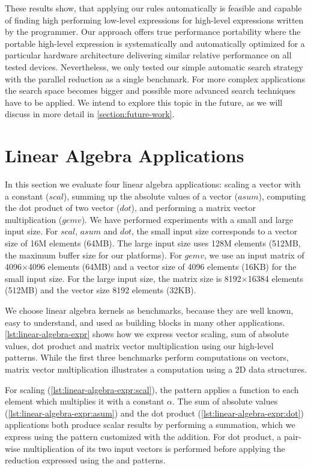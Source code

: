 \bigskip

\noindent
These results show, that applying our rules automatically is feasible and capable of finding high performing low-level expressions for high-level expressions written by the programmer.
Our approach offers true performance portability where the portable high-level expression is systematically and automatically optimized for a particular hardware architecture delivering similar relative performance on all tested devices.
Nevertheless, we only tested our simple automatic search strategy with the parallel reduction as a single benchmark.
For more complex applications the search space becomes bigger and possible more advanced search techniques have to be applied.
We intend to explore this topic in the future, as we will discuss in more detail in \autoref{section:future-work}.




\section{Linear Algebra Applications}

In this section we evaluate four linear algebra applications: scaling a vector with a constant ($scal$), summing up the absolute values of a vector ($asum$), computing the dot product of two vector ($dot$), and performing a matrix vector multiplication ($gemv$).
We have performed experiments with a small and large input size.
For $scal$, $asum$ and $dot$, the small input size corresponds to a vector size of 16M elements (64MB).
The large input size uses 128M elements (512MB, the maximum \OpenCL buffer size for our platforms).
For $gemv$, we use an input matrix of 4096$\times$4096 elements (64MB) and a vector size of 4096 elements (16KB) for the small input size.
For the large input size, the matrix size is 8192$\times$16384 elements (512MB) and the vector size 8192 elements (32KB).

We choose linear algebra kernels as benchmarks, because they are well known, easy to understand, and used as building blocks in many other applications.
\autoref{lst:linear-algebra-expr} shows how we express vector scaling, sum of absolute values, dot product and matrix vector multiplication using our high-level patterns.
While the first three benchmarks perform computations on vectors, matrix vector multiplication illustrates a computation using a 2D data structures.

For scaling (\autoref{lst:linear-algebra-expr:scal}), the \map pattern applies a function to each element which multiplies it with a constant $\alpha$.
The sum of absolute values (\autoref{lst:linear-algebra-expr:asum}) and the dot product (\autoref{lst:linear-algebra-expr:dot}) applications both produce scalar results by performing a summation, which we express using the \reduce pattern customized with the addition.
For dot product, a pair-wise multiplication of its two input vectors is performed before applying the reduction expressed using the \zip and \map patterns.

